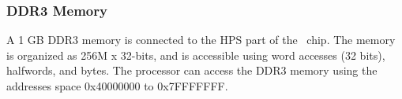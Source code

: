 \subsubsection{DDR3 Memory}
\label{sec:ddr3}
A 1 GB DDR3 memory is connected to the HPS part of the
\FPGADeviceFamily~chip.  The memory is organized as 256M {\sf x} 32-bits, and is accessible 
using word accesses (32 bits), halfwords, and bytes. The {\processor} processor can access the 
DDR3 memory using the addresses space {\sf 0x40000000} to {\sf 0x7FFFFFFF}.  

